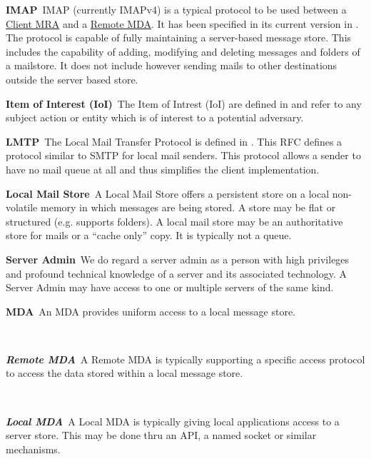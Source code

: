 \documentclass[a4paper,appendixprefix,pdfusetitle,twocolumn,fontsize=8pt,draft,DIV=calc]{scrbook}
\newenvironment{entry}{\par\leavevmode\hangpara{1.5mm}{1}\ignorespaces}{\RaggedRight\par}
\newcommand*{\mainentry}[2]{{\bfseries{#1\label{def:#1}}}~#2\par}
\newcommand*{\subentry}[2]{\par~\begin{minipage}{\columnwidth-0.6cm}{\bfseries{\itshape{#1\label{def:#1}}}}~#2\end{minipage}}
\newcommand*{\defref}[1]{\hyperref[def:#1]{#1}}
\begin{document}
\begin{entry}
	\mainentry{IMAP}{IMAP (currently IMAPv4) is a typical protocol to be used between a \defref{Client MRA} and a \defref{Remote MDA}. It has been specified in its current version in \cite{RFC3501}. The protocol is capable of fully maintaining a server-based message store. This includes the capability of adding, modifying and deleting messages and folders of a mailstore. It does not include however sending mails to other destinations outside the server based store.}
\end{entry}

\begin{entry}
	\mainentry{Item of Interest (IoI)}{The Item of Intrest (IoI) are defined in \cite{anonTerminology} and refer to any subject action or entity which is of interest to a potential adversary.}
\end{entry}

\begin{entry}
	\mainentry{LMTP}{The Local Mail Transfer Protocol is defined in \cite{RFC2033}. This RFC defines a protocol similar to SMTP for local mail senders. This protocol allows a sender to have no mail queue at all and thus simplifies the client implementation.}
\end{entry}

\begin{entry}
	\mainentry{Local Mail Store}{A Local Mail Store offers a persistent store on a local non-volatile memory in which messages are being stored. A store may be flat or structured (e.g. supports folders). A local mail store may be an authoritative store for mails or a ``cache only'' copy. It is typically not a queue.}
\end{entry}

\begin{entry}
	\mainentry{Server Admin}{We do regard a server admin as a person with high privileges and profound technical knowledge of a server and its associated technology. A Server Admin may have access to one or multiple servers of the same kind.}
\end{entry}

\begin{entry}
	\mainentry{MDA}{An MDA provides uniform access to a local message store.}
	\subentry{Remote MDA}{A Remote MDA is typically supporting a specific access protocol to access the data stored within a local message store.}
	\subentry{Local MDA}{A Local MDA is typically giving local applications access to a server store. This may be done thru an API, a named socket or similar mechanisms.}
\end{entry}
\end{document}
